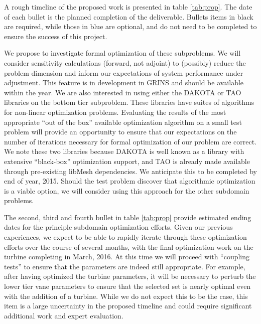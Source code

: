 

%
%
A rough timeline of the proposed work is presented in table
\ref{tab:prop}. The date of each bullet is the planned completion of the
deliverable. Bullets items in black are required, while those in blue
are optional, and do not need to be completed to ensure the
success of this project. 

% 
% 
We propose to investigate formal optimization of these subproblems. 
We will consider sensitivity calculations (forward, not adjoint)
to (possibly) reduce the problem dimension and inform our expectations
of system performance under adjustment. This feature is in development
in GRINS and should be available within the year. We are also interested
in using either the DAKOTA\cite{adams2013dakota} or
TAO\cite{tao-user-ref} libraries on the bottom tier subproblem. These
libraries have suites of algorithms for non-linear optimization
problems. Evaluating the results of the most appropriate ``out of the
box'' available optimization algorithm on a small test problem will
provide an opportunity to ensure that our expectations on the number of
iterations necessary for formal optimization of our problem are correct. 
We note these two libraries because DAKOTA is well known as a library
with extensive ``black-box'' optimization support, and TAO is already
made available through pre-existing libMesh dependencies. We anticipate
this to be completed by end of year, 2015. Should the test problem
discover that algorithmic optimization is a viable option, we will
consider using this approach for the other subdomain problems. 
%
%

The second, third and fourth bullet in table \ref{tab:prop} provide
estimated ending dates for the principle subdomain optimization
efforts. Given our previous experiences, we expect to be able to rapidly
iterate through these optimization efforts over the course of several
months, with the final optimization work on the turbine completing in
March, 2016. At this time we will proceed with ``coupling tests'' to
ensure that the parameters are indeed still appropriate. For example,
after having optimized the turbine parameters, it will be necessary to
perturb the lower tier vane parameters to ensure that the selected set
is nearly optimal even with the addition of a turbine. While we do not
expect this to be the case, this item is a large uncertainty in the
proposed timeline and could
require significant additional work and expert evaluation. 

